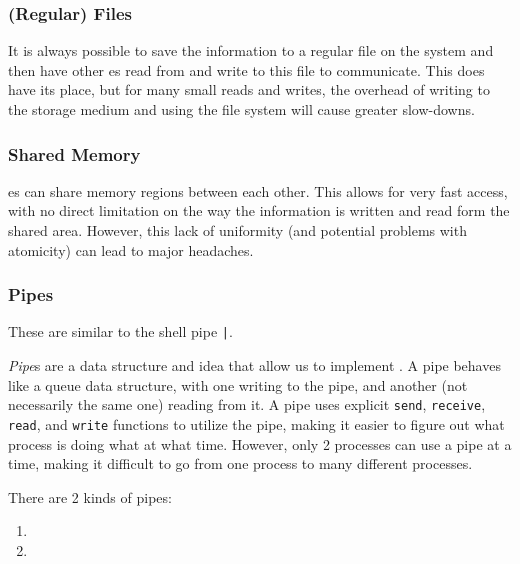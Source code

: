 \subsubsection{(Regular) Files}\label{subsubsec:IPC_Mechanism-Regular_Files}
It is always possible to save the information to a regular file on the system and then have other es read from and write to this file to communicate.
This does have its place, but for many small reads and writes, the overhead of writing to the storage medium and using the file system will cause greater slow-downs.

\subsubsection{Shared Memory}\label{subsubsec:IPC_Mechanism-Shared_Memory}
es can share memory regions between each other.
This allows for very fast access, with no direct limitation on the way the information is written and read form the shared area.
However, this lack of uniformity (and potential problems with atomicity) can lead to major headaches.

\subsubsection{Pipes}\label{subsubsec:IPC_Mechanism-Pipes}
These are similar to the shell pipe \texttt{|}.

\begin{definition}[Pipe]\label{def:Pipe}
  \emph{Pipe}s are a data structure and idea that allow us to implement .
  A pipe behaves like a queue data structure, with one  writing to the pipe, and another (not necessarily the same one) reading from it.
  A pipe uses explicit \texttt{send}, \texttt{receive}, \texttt{read}, and \texttt{write} functions to utilize the pipe, making it easier to figure out what process is doing what at what time.
  However, only 2 processes can use a pipe at a time, making it difficult to go from one process to many different processes.

  There are 2 kinds of pipes:
  \begin{enumerate}[noitemsep]
  \item {}
  \item {}
  \end{enumerate}
\end{definition}

